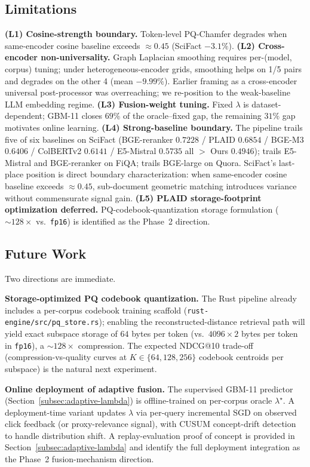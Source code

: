 \documentclass[review,1p]{elsarticle}
\begin{document}
\subsection{Limitations}
\label{subsec:limitations}

\textbf{(L1) Cosine-strength boundary.} Token-level PQ-Chamfer degrades when same-encoder cosine baseline exceeds $\approx 0.45$ (SciFact $-3.1\%$). \textbf{(L2) Cross-encoder non-universality.} Graph Laplacian smoothing requires per-(model, corpus) tuning; under heterogeneous-encoder grids, smoothing helps on 1/5 pairs and degrades on the other 4 (mean $-9.99\%$). Earlier framing as a cross-encoder universal post-processor was overreaching; we re-position to the weak-baseline LLM embedding regime. \textbf{(L3) Fusion-weight tuning.} Fixed $\lambda$ is dataset-dependent; GBM-11 closes $69\%$ of the oracle--fixed gap, the remaining $31\%$ gap motivates online learning. \textbf{(L4) Strong-baseline boundary.} The pipeline trails five of six baselines on SciFact (BGE-reranker $0.7228$ / PLAID $0.6854$ / BGE-M3 $0.6406$ / ColBERTv2 $0.6141$ / E5-Mistral $0.5735$ all $>$ Ours $0.4946$); trails E5-Mistral and BGE-reranker on FiQA; trails BGE-large on Quora. SciFact's last-place position is direct boundary characterization: when same-encoder cosine baseline exceeds $\approx 0.45$, sub-document geometric matching introduces variance without commensurate signal gain. \textbf{(L5) PLAID storage-footprint optimization deferred.} PQ-codebook-quantization storage formulation ($\sim 128\times$ vs.\ \texttt{fp16}) is identified as the Phase~2 direction.

\subsection{Future Work}
\label{subsec:future-work}

Two directions are immediate.

\textbf{Storage-optimized PQ codebook quantization.} The Rust pipeline already includes a per-corpus codebook training scaffold (\texttt{rust-engine/src/pq\_store.rs}); enabling the reconstructed-distance retrieval path will yield exact subspace storage of $64$ bytes per token (vs.\ $4096 \times 2$ bytes per token in \texttt{fp16}), a ${\sim}128\times$ compression. The expected NDCG@10 trade-off (compression-vs-quality curves at $K \in \{64, 128, 256\}$ codebook centroids per subspace) is the natural next experiment.

\textbf{Online deployment of adaptive fusion.} The supervised GBM-11 predictor (Section~\ref{subsec:adaptive-lambda}) is offline-trained on per-corpus oracle $\lambda^\star$. A deployment-time variant updates $\lambda$ via per-query incremental SGD on observed click feedback (or proxy-relevance signal), with CUSUM concept-drift detection to handle distribution shift. A replay-evaluation proof of concept is provided in Section~\ref{subsec:adaptive-lambda} and identify the full deployment integration as the Phase~2 fusion-mechanism direction.
\end{document}
